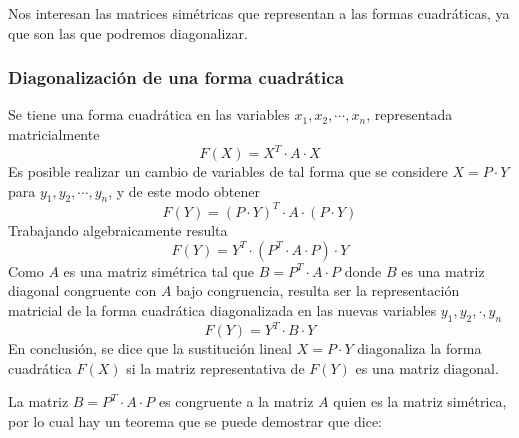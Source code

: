 \begin{tcolorbox}[myconclusion]
  Nos interesan las matrices simétricas que representan a las formas cuadráticas, ya que son las que podremos diagonalizar.
\end{tcolorbox}

\subsubsection{Diagonalización de una forma cuadrática}

Se tiene una forma cuadrática en las variables \(x_1,x_2,\cdots, x_n\), representada matricialmente
\[
  F(X) = X^T \cdot A \cdot X
\]
Es posible realizar un cambio de variables de tal forma que se considere \(X=P\cdot Y\) para \(y_1,y_2,\cdots,y_n\), y de este modo obtener
\[
  F(Y) = (P\cdot Y)^T \cdot A \cdot (P\cdot Y)
\]
Trabajando algebraicamente resulta
\[
  F(Y) = Y^T\cdot (P^T \cdot A \cdot P) \cdot Y
\]
Como \(A\) es una matriz simétrica tal que \(B = P^T \cdot A \cdot P\) donde \(B\) es una matriz diagonal congruente con \(A\) bajo congruencia, resulta ser la representación matricial de la forma cuadrática diagonalizada en las nuevas variables \(y_1,y_2,\cdot, y_n\)
\[
  F(Y) = Y^T \cdot B \cdot Y
\]
En conclusión, se dice que  la sustitución lineal \(X=P\cdot Y\) diagonaliza la forma cuadrática \(F(X)\) si la matriz representativa de \(F(Y)\) es una matriz diagonal.


La matriz \(B=P^T \cdot A \cdot P\) es congruente a la matriz \(A\) quien es la matriz simétrica, por lo cual hay un teorema que se puede demostrar que dice:
\begin{quote}
\end{quote}


